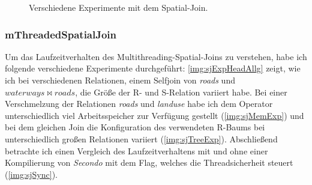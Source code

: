 \documentclass[a4paper,12pt,twoside]{article}
\newcommand{\Fb}[1]{\textit{#1}} %
\begin{document}
\begin{figure}
	\centering
	\caption{Verschiedene Experimente mit dem Spatial-Join.}
	\label{img:sjExpAllg}
\end{figure}

\subsubsection{mThreadedSpatialJoin}
\label{exp:sj}

Um das Laufzeitverhalten des Multithreading-Spatial-Joins zu verstehen, habe ich folgende verschiedene Experimente durchgeführt: \autoref{img:sjExpHeadAllg} zeigt, wie ich bei verschiedenen Relationen, einem Selfjoin von \Fb{roads} und $waterways \bowtie roads$, die Größe der R- und S-Relation variiert habe. Bei einer Verschmelzung der Relationen \Fb{roads} und \Fb{landuse} habe ich dem Operator unterschiedlich viel Arbeitsspeicher zur Verfügung gestellt (\autoref{img:sjMemExp}) und bei dem gleichen Join die Konfiguration des verwendeten R-Baums bei unterschiedlich großen Relationen variiert (\autoref{img:sjTreeExp}). Abschließend betrachte ich einen Vergleich des Laufzeitverhaltens mit und ohne einer Kompilierung von \Fb{Secondo} mit dem Flag, welches die Threadsicherheit steuert (\autoref{img:sjSync}). 
\end{document}
